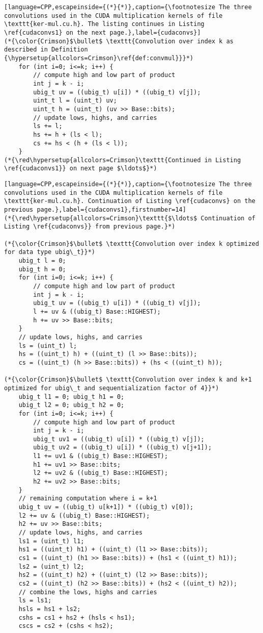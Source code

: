 \begin{lstlisting}[language=CPP,escapeinside={(*}{*)},caption={\footnotesize The three convolutions used in the CUDA multiplication kernels of file \texttt{ker-mul.cu.h}. The listing continues in Listing \ref{cudaconvs1} on the next page.},label={cudaconvs}]
(*{\color{Crimson}$\bullet$ \texttt{Convolution over index k as described in Definition {\hypersetup{allcolors=Crimson}\ref{def:convmul}}}*)
    for (int i=0; i<=k; i++) {
        // compute high and low part of product
        int j = k - i;
        ubig_t uv = ((ubig_t) u[i]) * ((ubig_t) v[j]);
        uint_t l = (uint_t) uv;
        uint_t h = (uint_t) (uv >> Base::bits);
        // update lows, highs, and carries
        ls += l;
        hs += h + (ls < l);
        cs += hs < (h + (ls < l));
    }
(*{\red\hypersetup{allcolors=Crimson}\texttt{Continued in Listing \ref{cudaconvs1}} on next page $\ldots$}*)
\end{lstlisting}
\begin{lstlisting}[language=CPP,escapeinside={(*}{*)},caption={\footnotesize The three convolutions used in the CUDA multiplication kernels of file \texttt{ker-mul.cu.h}. Continuation of Listing \ref{cudaconvs} on the previous page.},label={cudaconvs1},firstnumber=14]
(*{\red\hypersetup{allcolors=Crimson}\texttt{$\ldots$ Continuation of Listing \ref{cudaconvs}} from previous page.}*)

(*{\color{Crimson}$\bullet$ \texttt{Convolution over index k optimized for data type ubig\_t}}*)
    ubig_t l = 0;
    ubig_t h = 0;
    for (int i=0; i<=k; i++) {
        // compute high and low part of product
        int j = k - i;
        ubig_t uv = ((ubig_t) u[i]) * ((ubig_t) v[j]);
        l += uv & ((ubig_t) Base::HIGHEST);
        h += uv >> Base::bits;
    }
    // update lows, highs, and carries
    ls = (uint_t) l;
    hs = ((uint_t) h) + ((uint_t) (l >> Base::bits));
    cs = ((uint_t) (h >> Base::bits)) + (hs < ((uint_t) h));

(*{\color{Crimson}$\bullet$ \texttt{Convolution over index k and k+1 optimized for ubig\_t and sequentialization factor of 4}}*)
    ubig_t l1 = 0; ubig_t h1 = 0;
    ubig_t l2 = 0; ubig_t h2 = 0;
    for (int i=0; i<=k; i++) {
        // compute high and low part of product
        int j = k - i;
        ubig_t uv1 = ((ubig_t) u[i]) * ((ubig_t) v[j]);
        ubig_t uv2 = ((ubig_t) u[i]) * ((ubig_t) v[j+1]);
        l1 += uv1 & ((ubig_t) Base::HIGHEST);
        h1 += uv1 >> Base::bits;
        l2 += uv2 & ((ubig_t) Base::HIGHEST);
        h2 += uv2 >> Base::bits;
    }
    // remaining computation where i = k+1
    ubig_t uv = ((ubig_t) u[k+1]) * ((ubig_t) v[0]);
    l2 += uv & ((ubig_t) Base::HIGHEST);
    h2 += uv >> Base::bits;
    // update lows, highs, and carries
    ls1 = (uint_t) l1;
    hs1 = ((uint_t) h1) + ((uint_t) (l1 >> Base::bits));
    cs1 = ((uint_t) (h1 >> Base::bits)) + (hs1 < ((uint_t) h1));
    ls2 = (uint_t) l2;
    hs2 = ((uint_t) h2) + ((uint_t) (l2 >> Base::bits));
    cs2 = ((uint_t) (h2 >> Base::bits)) + (hs2 < ((uint_t) h2));
    // combine the lows, highs and carries
    ls = ls1;
    hsls = hs1 + ls2;
    cshs = cs1 + hs2 + (hsls < hs1);
    cscs = cs2 + (cshs < hs2);
\end{lstlisting}


